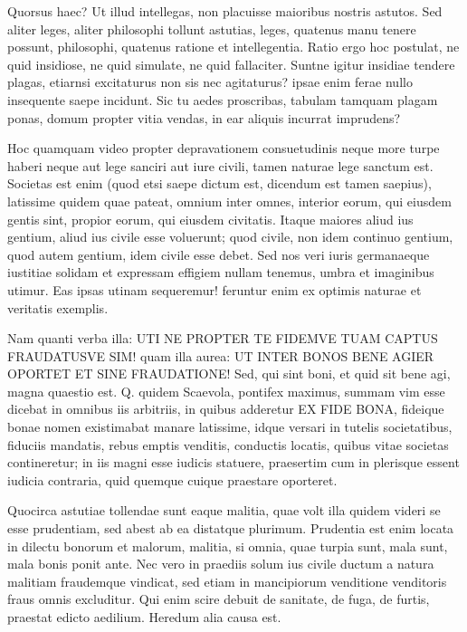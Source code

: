  Quorsus haec? Ut illud intellegas, non placuisse maioribus nostris astutos. Sed aliter leges, aliter philosophi tollunt astutias, leges, quatenus manu tenere possunt, philosophi, quatenus ratione et intellegentia. Ratio ergo hoc postulat, ne quid insidiose, ne quid simulate, ne quid fallaciter. Suntne igitur insidiae tendere plagas, etiarnsi excitaturus non sis nec agitaturus? ipsae enim ferae nullo insequente saepe incidunt. Sic tu aedes proscribas, tabulam tamquam plagam ponas, domum propter vitia vendas, in ear aliquis incurrat imprudens?

 Hoc quamquam video propter depravationem consuetudinis neque more turpe haberi neque aut lege sanciri aut iure civili, tamen naturae lege sanctum est. Societas est enim (quod etsi saepe dictum est, dicendum est tamen saepius), latissime quidem quae pateat, omnium inter omnes, interior eorum, qui eiusdem gentis sint, propior eorum, qui eiusdem civitatis. Itaque maiores aliud ius gentium, aliud ius civile esse voluerunt; quod civile, non idem continuo gentium, quod autem gentium, idem civile esse debet. Sed nos veri iuris germanaeque iustitiae solidam et expressam effigiem nullam tenemus, umbra et imaginibus utimur. Eas ipsas utinam sequeremur! feruntur enim ex optimis naturae et veritatis exemplis.

 Nam quanti verba illa: UTI NE PROPTER TE FIDEMVE TUAM CAPTUS FRAUDATUSVE SIM! quam illa aurea: UT INTER BONOS BENE AGIER OPORTET ET SINE FRAUDATIONE! Sed, qui sint boni, et quid sit bene agi, magna quaestio est. Q. quidem Scaevola, pontifex maximus, summam vim esse dicebat in omnibus iis arbitriis, in quibus adderetur EX FIDE BONA, fideique bonae nomen existimabat manare latissime, idque versari in tutelis societatibus, fiduciis mandatis, rebus emptis venditis, conductis locatis, quibus vitae societas contineretur; in iis magni esse iudicis statuere, praesertim cum in plerisque essent iudicia contraria, quid quemque cuique praestare oporteret.

 Quocirca astutiae tollendae sunt eaque malitia, quae volt illa quidem videri se esse prudentiam, sed abest ab ea distatque plurimum. Prudentia est enim locata in dilectu bonorum et malorum, malitia, si omnia, quae turpia sunt, mala sunt, mala bonis ponit ante. Nec vero in praediis solum ius civile ductum a natura malitiam fraudemque vindicat, sed etiam in mancipiorum venditione venditoris fraus omnis excluditur. Qui enim scire debuit de sanitate, de fuga, de furtis, praestat edicto aedilium. Heredum alia causa est.

